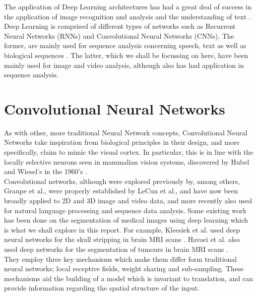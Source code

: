 \documentclass[11pt,a4paper]{memoir}
\numberwithin{figure}{section}
\numberwithin{table}{section}
\numberwithin{equation}{section}
\begin{document}
The application of Deep Learning architectures has had a great deal of success in the application of image recognition and analysis \cite{Goodfellow2013Multi-digitNetworks} and the understanding of text \cite{Mikolov2013ExploitingTranslation}. Deep Learning is comprised of different types of networks such as Recurrent Neural Networks (RNNs) and Convolutional Neural Networks (CNNs). The former, are mainly used for sequence analysis concerning speech, text as well as biological sequences \cite{Graves2013SpeechNetworks} \cite{Alipanahi2015}. The latter, which we shall be focussing on here, have been mainly used for image and video analysis, although also has had application in sequence analysis.

\section{Convolutional Neural Networks}

As with other, more traditional Neural Network concepts, Convolutional Neural Networks take inspiration from biological principles in their design, and more specifically, claim to mimic the visual cortex. In particular, this is in line with the locally selective neurons seen in mammalian vision systems, discovered by Hubel and Wiesel's in the 1960's \cite{HUBEL1962}. \\

Convolutional networks, although were explored previously by, among others, Graupe et al.\cite{Graupe1988ApplicationsProcessing}, were properly established by LeCun et al.\cite{LeCun2015DeepLearning}, and have now been broadly applied to 2D and 3D image and video data, and more recently also used for natural language processing and sequence data analysis. Some existing work has been done on the segmentation of medical images using deep learning which is what we shall explore in this report. For example, Kleesiek et al. used deep neural networks for the skull stripping in brain MRI scans \cite{Kleesiek2016DeepStripping}. Havaei et al. also used deep networks for the segmentation of tumours in brain MRI scans \cite{Havaei2017BrainNetworks}. \\

They employ three key mechanisms which make them differ form traditional neural networks; local receptive fields, weight sharing and sub-sampling. These mechanisms aid the building of a model which is invariant to translation, and can provide information regarding the spatial structure of the input.
\end{document}
